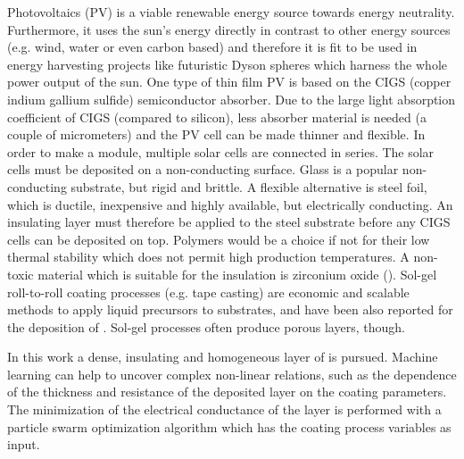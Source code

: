 Photovoltaics (PV) is a viable renewable energy source towards energy neutrality.
Furthermore, 
it uses the sun's energy directly in contrast to other energy sources (e.g. wind, water or even carbon based) and therefore 
it is fit to be used in energy harvesting projects like futuristic Dyson spheres\cite{dyson1960search, kardashev1964transmission} which harness the whole power output of the sun.
%
One type  of thin film PV is based on the CIGS (copper indium gallium sulfide) semiconductor absorber\cite{Vasekar2010}. 
Due to the large light absorption coefficient of CIGS (compared to silicon), less absorber material is needed (a couple of micrometers) and the PV cell can be made thinner and flexible. 
In order to make a module, multiple solar cells are connected in series. 
The solar cells must be deposited on a non-conducting surface.
Glass is a popular non-conducting substrate, but rigid and brittle. 
A flexible alternative is steel foil, which is ductile, inexpensive and highly available, but electrically conducting. 
An insulating layer must therefore be applied to the steel substrate before any CIGS cells can be deposited on top.
Polymers would be a choice if not for their low thermal stability which does not permit high production temperatures.
A non-toxic material which is suitable for the insulation is zirconium oxide (). 
Sol-gel roll-to-roll coating processes (e.g. tape casting) are economic and scalable methods to apply liquid precursors to substrates, and have been also reported for the deposition of \cite{yeo1998design,michalek2015comparison}.
Sol-gel processes often produce porous layers, though. 

In this work a dense, insulating and homogeneous layer of  is pursued. 
Machine learning can help to uncover complex non-linear relations, such as the 
dependence of the thickness and resistance of the deposited layer on the coating parameters.
The minimization of the electrical conductance of the layer is performed with a particle swarm optimization 
algorithm which has the coating process variables as input. 


